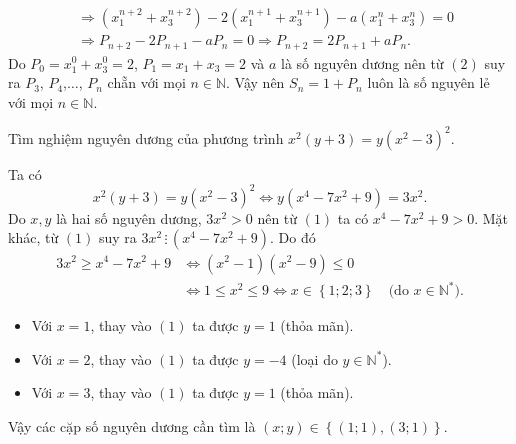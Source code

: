 \begin{ex}
{\begin{enumerate}[a)]
\begin{align*}
&\Rightarrow (x_1^{n+2}+x_3^{n+2})-2(x_1^{n+1}+x_3^{n+1})-a(x_1^{n}+x_3^{n})=0\\
&\Rightarrow P_{n+2}-2P_{n+1}-aP_n=0\Rightarrow P_{n+2}=2P_{n+1}+aP_n.\tag{2}
\end{align*}
Do $P_0=x_1^0+x_3^0=2$, $P_1=x_1+x_3=2$ và $a$ là số nguyên dương nên từ $(2)$ suy ra $P_3$, $P_4$,$\ldots$, $P_n$ chẵn với mọi $n\in\mathbb{N}$. Vậy nên $S_n=1+P_n$ luôn là số nguyên lẻ với mọi $n\in\mathbb{N}$.
\end{enumerate}
    }
\end{ex}

\begin{ex}%
Tìm nghiệm nguyên dương của phương trình $x^2(y+3)=y(x^2-3)^2$.
\loigiai
    {
Ta có \[x^2(y+3)=y(x^2-3)^2\Leftrightarrow y(x^4-7x^2+9)=3x^2.\tag{1}\]
Do $x,y$ là hai số nguyên dương, $3x^2>0$ nên từ $(1)$ ta có $x^4-7x^2+9>0$. Mặt khác, từ $(1)$ suy ra $3x^2\,\vdots\, (x^4-7x^2+9)$. Do đó $$\begin{aligned}
3x^2\ge x^4-7x^2+9 &\Leftrightarrow (x^2-1)(x^2-9)\le 0\\ 
&\Leftrightarrow 1\le x^2\le 9\Leftrightarrow x\in\left\{1;2;3\right\}\quad\text{(do $x\in\mathbb{N}^\ast$)}.
\end{aligned}$$
\begin{itemize}
\item Với $x=1$, thay vào $(1)$ ta được $y=1$ (thỏa mãn).
\item Với $x=2$, thay vào $(1)$ ta được $y=-4$ (loại do $y\in\mathbb{N}^\ast$).
\item Với $x=3$, thay vào $(1)$ ta được $y=1$ (thỏa mãn).
\end{itemize}
Vậy các cặp số nguyên dương cần tìm là $(x;y)\in\left\{(1;1), (3;1)\right\}$.
    }
\end{ex}

